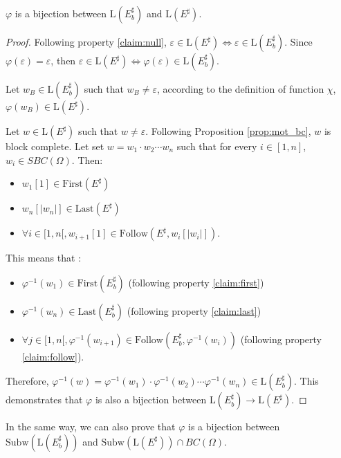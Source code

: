 \documentclass{llncs}
\begin{document}
\begin{proposition}\label{prop:bijectionLangage}
	$\varphi$ is a bijection between $\mathrm{L}(E_b^{\sharp})$ and $\mathrm{L}(E^{\sharp})$.
\end{proposition}
\begin{proof}
	Following property \eqref{claim:null}, $\varepsilon \in \mathrm{L}(E^{\sharp})\Longleftrightarrow \varepsilon \in \mathrm{L}(E_b^{\sharp})$.
	Since $\varphi(\varepsilon) = \varepsilon$, then $\varepsilon \in \mathrm{L}(E^{\sharp})\Longleftrightarrow \varphi(\varepsilon) \in \mathrm{L}(E_b^{\sharp})$.

	Let $w_B \in \mathrm{L}(E_b^{\sharp})$ such that $w_B \neq \varepsilon$, according to the definition of function $\chi$, $\varphi(w_B) \in \mathrm{L}(E^{\sharp})$.
	
	Let $w \in \mathrm{L}(E^{\sharp})$ such that $w \neq \varepsilon$.
	Following Proposition \ref{prop:mot_bc}, $w$ is block complete.
	Let set $w = w_1 \cdot w_2 \cdots w_n$ such that for every $i \in [1, n]$, $w_i \in SBC(\Omega)$.
	Then:
	\begin{itemize}
		\item $w_1[1] \in \mathrm{First}(E^{\sharp})$
		\item $w_n[|w_n|] \in \mathrm{Last}(E^{\sharp})$
		\item $\forall i \in [1, n[, w_{i+1}[1] \in \mathrm{Follow}(E^{\sharp}, w_i[|w_i|])$.
	\end{itemize}
	This means that :
	\begin{itemize}
		\item $\varphi^{-1}(w_1) \in \mathrm{First}(E_b^{\sharp})$ (following property \eqref{claim:first})
		\item $\varphi^{-1}(w_n) \in \mathrm{Last}(E_b^{\sharp})$ (following property \eqref{claim:last})
		\item $\forall j \in [1, n[, \varphi^{-1}(w_{i+1}) \in \mathrm{Follow}(E_b^{\sharp}, \varphi^{-1}(w_i))$ (following property \eqref{claim:follow}).
	\end{itemize}
	Therefore, $\varphi^{-1}(w) =  \varphi^{-1}(w_1) \cdot \varphi^{-1}(w_2) \cdots \varphi^{-1}(w_n) \in \mathrm{L}(E_b^{\sharp})$.
	This demonstrates that $\varphi$ is also a bijection between $\mathrm{L}(E_b^{\sharp}) \rightarrow \mathrm{L}(E^{\sharp})$.
\end{proof}

In the same way, we can also prove that $\varphi$ is a bijection between $\mathrm{Subw}(\mathrm{L}(E_b^{\sharp}))$ and $\mathrm{Subw}(\mathrm{L}(E^{\sharp})) \cap BC(\Omega)$.
\end{document}
